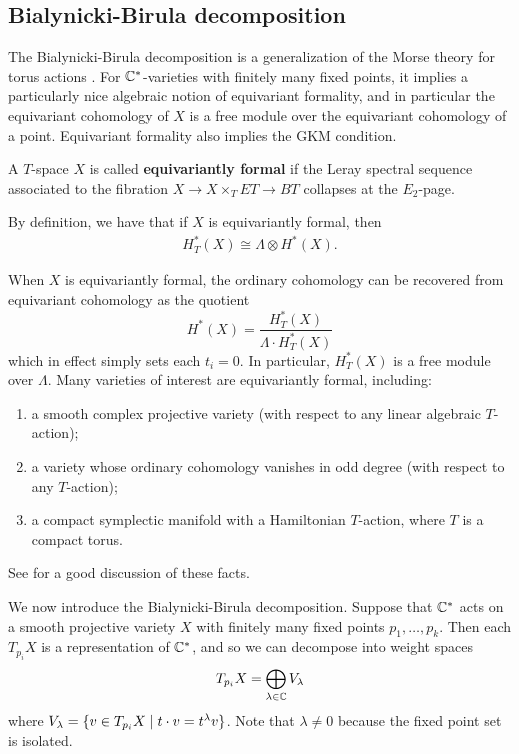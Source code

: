 \subsection{Bialynicki-Birula decomposition}
The Bialynicki-Birula decomposition is a generalization of the Morse theory for torus actions \cite{bb}. For $\mathbb{C}^*$-varieties with finitely many fixed points, it implies a particularly nice algebraic notion of equivariant formality, and in particular the equivariant cohomology of $X$ is a free module over the equivariant cohomology of a point. Equivariant formality also implies the GKM condition.

\begin{definition}
	A $T$-space $X$ is called \textbf{equivariantly formal} if the Leray spectral sequence
	associated to the fibration $X \to X \times_T ET \to BT$ collapses at the $E_2$-page.
\end{definition}

By definition, we have that if $X$ is equivariantly formal, then \begin{align*}
	H^*_T(X) \cong \Lambda \otimes H^*(X).
\end{align*}


When $X$ is equivariantly formal, the ordinary cohomology can be recovered from equivariant cohomology as the quotient
\[
	H^*(X) = \frac{H^*_T(X)}{\Lambda \cdot H^*_T(X)}
\]
which in effect simply sets each $t_i = 0$. In particular, $H^*_T(X)$ is a free module over $\Lambda$. Many varieties of interest are equivariantly formal, including:
\begin{enumerate}
	\item a smooth complex projective variety (with respect to any linear algebraic $T$-action);
	\item a variety whose ordinary cohomology vanishes in odd degree (with respect to any $T$-action);
	\item a compact symplectic manifold with a Hamiltonian $T$-action, where $T$ is a compact torus.
\end{enumerate}
See \cite{fulton-anderson} for a good discussion of these facts.



We now introduce the Bialynicki-Birula decomposition. Suppose that $\mathbb{C}^*$ acts on a smooth projective variety $X$ with finitely many fixed points $p_1,\ldots,p_k$. Then each $T_{p_i}X$ is a representation of $\mathbb{C}^*$, and so we can decompose
into weight spaces \begin{align*}
	T_{p_i}X = \bigoplus_{\lambda\in \mathbb{C}} V_\lambda
\end{align*} where $V_\lambda = \{v\in T_{p_i}X \mid t\cdot v = t^\lambda v\}$. Note that $\lambda\neq 0 $ because the fixed point set is isolated.

